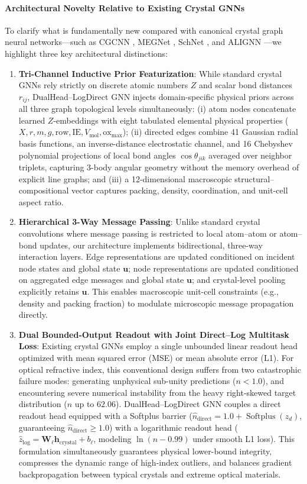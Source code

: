 \documentclass[journal,article,submit,moreauthors,pdftex]{article}
\begin{document}
\paragraph{Architectural Novelty Relative to Existing Crystal GNNs}
To clarify what is fundamentally new compared with canonical crystal graph neural networks---such as CGCNN \cite{xie2018crystal}, MEGNet \cite{chen2019graph}, SchNet \cite{schutt2017schnet}, and ALIGNN \cite{choudhary2021atomistic}---we highlight three key architectural distinctions:
\begin{enumerate}
    \item \textbf{Tri-Channel Inductive Prior Featurization}: While standard crystal GNNs rely strictly on discrete atomic numbers $Z$ and scalar bond distances $r_{ij}$, DualHead--LogDirect GNN injects domain-specific physical priors across all three graph topological levels simultaneously: (i) atom nodes concatenate learned $Z$-embeddings with eight tabulated elemental physical properties ($X, r, m, g, \text{row}, \text{IE}, V_{\mathrm{mol}}, \text{ox}_{\max}$); (ii) directed edges combine 41 Gaussian radial basis functions, an inverse-distance electrostatic channel, and 16 Chebyshev polynomial projections of local bond angles $\cos\theta_{jik}$ averaged over neighbor triplets, capturing 3-body angular geometry without the memory overhead of explicit line graphs; and (iii) a 12-dimensional macroscopic structural--compositional vector captures packing, density, coordination, and unit-cell aspect ratio.
    \item \textbf{Hierarchical 3-Way Message Passing}: Unlike standard crystal convolutions where message passing is restricted to local atom--atom or atom--bond updates, our architecture implements bidirectional, three-way interaction layers. Edge representations are updated conditioned on incident node states and global state $\mathbf{u}$; node representations are updated conditioned on aggregated edge messages and global state $\mathbf{u}$; and crystal-level pooling explicitly retains $\mathbf{u}$. This enables macroscopic unit-cell constraints (e.g., density and packing fraction) to modulate microscopic message propagation directly.
    \item \textbf{Dual Bounded-Output Readout with Joint Direct--Log Multitask Loss}: Existing crystal GNNs employ a single unbounded linear readout head optimized with mean squared error (MSE) or mean absolute error (L1). For optical refractive index, this conventional design suffers from two catastrophic failure modes: generating unphysical sub-unity predictions ($n < 1.0$), and encountering severe numerical instability from the heavy right-skewed target distribution ($n$ up to $62.06$). DualHead--LogDirect GNN couples a direct readout head equipped with a Softplus barrier ($\hat{n}_{\mathrm{direct}} = 1.0 + \operatorname{Softplus}(z_d)$, guaranteeing $\hat{n}_{\mathrm{direct}} \ge 1.0$) with a logarithmic readout head ($\hat{z}_{\mathrm{log}} = \mathbf{W}_\ell \mathbf{h}_{\mathrm{crystal}} + b_\ell$, modeling $\ln(n - 0.99)$ under smooth L1 loss). This formulation simultaneously guarantees physical lower-bound integrity, compresses the dynamic range of high-index outliers, and balances gradient backpropagation between typical crystals and extreme optical materials.

\end{enumerate}
\end{document}

